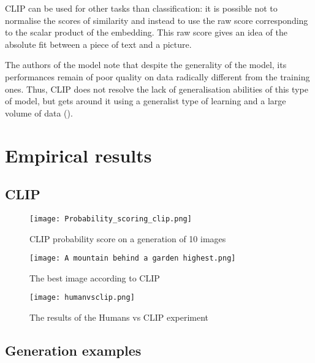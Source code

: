 \documentclass{article}
\begin{document}
\begin{appendix}
\begin{multicols}{2}
CLIP can be used for other tasks than classification: it is possible not to normalise the scores of similarity and instead to use the raw score corresponding to the scalar product of the embedding. This raw score gives an idea of the absolute fit between a piece of text and a picture. 

The authors of the model note that despite the generality of the model, its performances remain of poor quality on data radically different from the training ones. Thus, CLIP does not resolve the lack of generalisation abilities of this type of model, but gets around it using a generalist type of learning and a large volume of data (\cite{openaiclip, learntransf}). 
\end{multicols}

\section{Empirical results}

\subsection{CLIP}
\label{app:clip-img}
\begin{figure}[H]
    \centering
    \texttt{[image: Probability\_scoring\_clip.png]}
    \caption{CLIP probability score on a generation of 10 images}
    \label{fig:clip_proba_exemple}
\end{figure}
\begin{figure}[H]
    \centering
    \texttt{[image: A mountain behind a garden highest.png]}
    \caption{The best image according to CLIP}
    \label{fig:clip_image_exemple}
\end{figure}
\begin{figure}[h!]
    \centering
    \texttt{[image: humanvsclip.png]}
    \caption{The results of the Humans vs CLIP experiment}
    \label{fig:Humans vs CLIP}
\end{figure}

\subsection{Generation examples}
\label{app:gen-examples}


\end{appendix}
\end{document}
